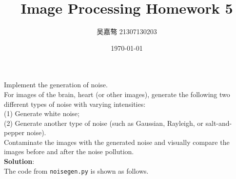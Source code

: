 \documentclass[UTF8]{ctexart}
\title{\textbf{Image Processing Homework 5}}
\author{吴嘉骜 21307130203}
\date{\today}
\begin{document}
\maketitle

\noindent
\section{}
\setlength{\parindent}{0pt}
Implement the generation of noise.\\
For images of the brain, heart (or other images), generate the following 
two different types of noise with varying intensities:\\
(1) Generate white noise;\\
(2) Generate another type of noise (such as Gaussian, Rayleigh, or salt-and-pepper noise).\\
Contaminate the images with the generated noise and visually compare the images before and after the noise pollution.\\
\textbf{Solution}:\\
The code from \texttt{noisegen.py} is shown as follows.\\
\end{document}
